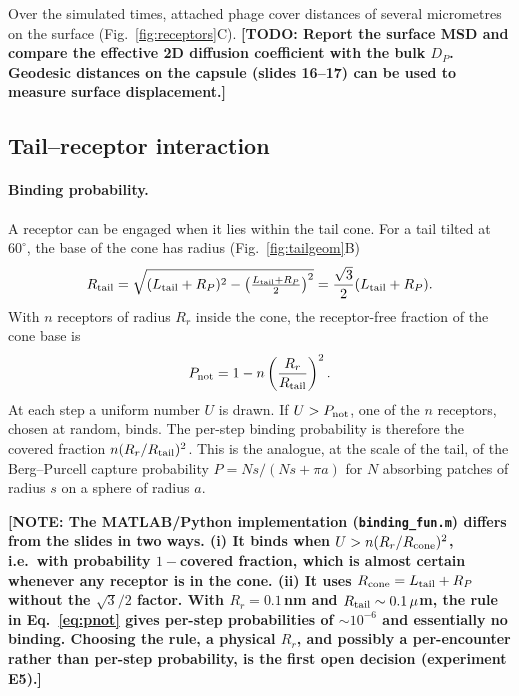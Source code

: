 \documentclass[12pt]{article}
\newcommand{\note}[1]{{\color{red}\textbf{[NOTE: #1]}}}
\newcommand{\todo}[1]{{\color{blue}\textbf{[TODO: #1]}}}
\begin{document}
Over the simulated times, attached phage cover distances of several micrometres on the surface (Fig.~\ref{fig:receptors}C). \todo{Report the surface MSD and compare the effective 2D diffusion coefficient with the bulk $D_P$. Geodesic distances on the capsule (slides 16--17) can be used to measure surface displacement.}

\subsection*{Tail--receptor interaction}
\paragraph{Binding probability.} A receptor can be engaged when it lies within the tail cone. For a tail tilted at $60^\circ$, the base of the cone has radius (Fig.~\ref{fig:tailgeom}B)
\begin{equation}
R_{\rm tail}=\sqrt{(L_{\rm tail}+R_P)^2-\left(\tfrac{L_{\rm tail}+R_P}{2}\right)^2}=\frac{\sqrt3}{2}(L_{\rm tail}+R_P).
\end{equation}
With $n$ receptors of radius $R_r$ inside the cone, the receptor-free fraction of the cone base is
\begin{equation}\label{eq:pnot}
P_{\rm not}=1-n\left(\frac{R_r}{R_{\rm tail}}\right)^2 .
\end{equation}
At each step a uniform number $U$ is drawn. If $U>P_{\rm not}$, one of the $n$ receptors, chosen at random, binds. The per-step binding probability is therefore the covered fraction $n(R_r/R_{\rm tail})^2$. This is the analogue, at the scale of the tail, of the Berg--Purcell capture probability $P=Ns/(Ns+\pi a)$ for $N$ absorbing patches of radius $s$ on a sphere of radius $a$\cite{berg1977physics}.

\note{The MATLAB/Python implementation (\texttt{binding\_fun.m}) differs from the slides in two ways. (i) It binds when $U>n(R_r/R_{\rm cone})^2$, i.e.\ with probability $1-$covered fraction, which is almost certain whenever any receptor is in the cone. (ii) It uses $R_{\rm cone}=L_{\rm tail}+R_P$ without the $\sqrt3/2$ factor. With $R_r=0.1$\,nm and $R_{\rm tail}\sim0.1\,\mu$m, the rule in Eq.~\eqref{eq:pnot} gives per-step probabilities of $\sim\!10^{-6}$ and essentially no binding. Choosing the rule, a physical $R_r$, and possibly a per-encounter rather than per-step probability, is the first open decision (experiment E5).}
\end{document}
